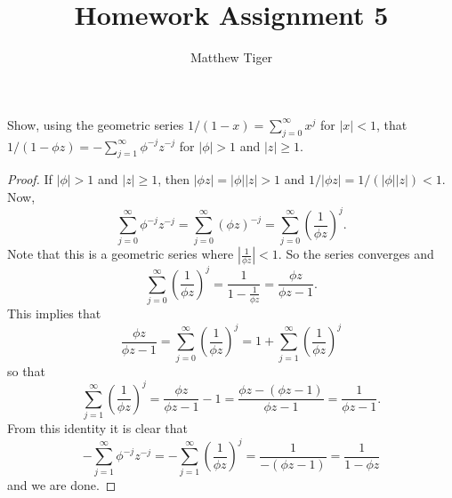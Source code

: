 \documentclass[12pt]{article}
\title{Homework Assignment 5}
\author{Matthew Tiger}
\theoremstyle{definition}
\newenvironment{custompbm}[1]
  {\renewcommand\theproblem{#1}\problem}
  {\endproblem}
\begin{document}
\maketitle


\begin{custompbm}{2.7}
   Show, using the geometric series $1/(1-x) = \sum_{j=0}^\infty x^j$ for $|x| < 1$,
   that $1/(1-\phi z) = -\sum_{j=1}^\infty \phi^{-j} z^{-j}$ for $|\phi| > 1$ and $|z| \geq 1$.
\end{custompbm}

\begin{proof}
  If $|\phi| > 1$ and $|z| \geq 1$, then $|\phi z| = |\phi| |z| > 1$ and
  $1 / |\phi z| = 1 / (|\phi| |z|) < 1$. Now,
  \[
    \sum_{j=0}^\infty \phi^{-j} z ^ {-j} = \sum_{j=0}^\infty (\phi z )^{-j} = \sum_{j=0}^\infty \left(\frac{1}{\phi z}\right)^j.
  \]
  Note that this is a geometric series where $|\frac{1}{\phi z}| < 1$. So the
  series converges and
  \[
    \sum_{j=0}^\infty \left(\frac{1}{\phi z}\right)^j = \frac{1}{1 - \frac{1}{\phi z}} = \frac{\phi z}{\phi z - 1}.
  \]
  This implies that
  \[
    \frac{\phi z}{\phi z - 1}  = \sum_{j=0}^\infty \left(\frac{1}{\phi z}\right)^j = 1 + \sum_{j=1}^\infty \left(\frac{1}{\phi z}\right)^j
  \]
  so that
  \[
    \sum_{j=1}^\infty \left(\frac{1}{\phi z}\right)^j = \frac{\phi z}{\phi z - 1} - 1 = \frac{\phi z - (\phi z - 1)}{\phi z - 1} = \frac{1}{\phi z - 1}.
  \]
  From this identity it is clear that
  \[
    - \sum_{j=1}^\infty \phi^{-j} z ^ {-j} = - \sum_{j=1}^\infty \left(\frac{1}{\phi z}\right)^j = \frac{1}{-(\phi z -1)} = \frac{1}{1 - \phi z}
  \]
  and we are done.
\end{proof}
\end{document}

